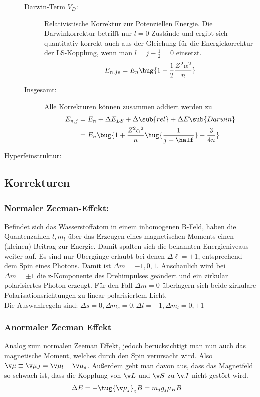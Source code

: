 \documentclass[twocolumn]{summery_4.1}
\begin{document}
\begin{description}
\begin{description}
        \item[Darwin-Term \(V_D\):] Relativistische Korrektur zur Potenziellen Energie. Die Darwinkorrektur betrifft nur \(l=0\) Zustände und ergibt sich quantitativ korrekt auch aus der Gleichung für die Energiekorrektur der LS-Kopplung, wenn man \(l=j-\frac12 =0\) einsetzt.
        \begin{align*}
            E_{n,js} = E_n\hug{1 - \frac{1}{2}\frac{Z^2\alpha^2}{n}}
        \end{align*}

        \item[Insgesamt:] Alle Korrekturen können zusammen addiert werden zu 
        \begin{align*}
            E_{n,j} &= E_n + \Delta E_{LS} + \Delta\sub{rel} + \Delta E\sub{Darwin}\\ 
            &= E_n \bug{1 + \frac{Z^2 \alpha^2}{n} \hug{\frac{1}{j + \half}}- \frac{3}{4n}}
        \end{align*}
    \end{description}


    \item[Hyperfeinstruktur:]
\end{description}



\subsection{Korrekturen}

\subsubsection{Normaler Zeeman-Effekt:}
Befindet sich das Wasserstoffatom in einem inhomogenen B-Feld, haben die Quantenzahlen \(l,m_l\) über das Erzeugen eines magnetischen Moments einen (kleinen) Beitrag zur Energie. Damit spalten sich die bekannten Energieniveaus weiter auf.     
Es sind nur Übergänge erlaubt bei denen \(\Delta \ell=\pm 1\), entsprechend dem Spin eines Photons. Damit ist \(\Delta m = -1,0,1\).
Anschaulich wird bei $\Delta m = \pm1$ die z-Komponente des Drehimpulses geändert
und ein zirkular polarisiertes Photon erzeugt. Für den Fall $\Delta m = 0$ überlagern sich beide zirkulare
Polarisationsrichtungen zu linear polarisiertem Licht.\\
Die Auswahlregeln sind: \(\Delta s = 0, \Delta m_s=0, \Delta l =\pm 1, \Delta m_l = 0,\pm1\)

\subsubsection{Anormaler Zeeman Effekt}
Analog zum normalen Zeeman Effekt, jedoch berücksichtigt man nun auch das magnetische Moment, welches durch den Spin verursacht wird. 
Also \(\v \mu \equiv \v \mu_J = \v \mu_l + \v \mu_s\). Außerdem geht man davon aus, dass das Magnetfeld so schwach ist, dass die Kopplung von \(\v L\) und \(\v S\) zu \(\v J\) nicht gestört wird. 
\begin{align*}
    \Delta E &= - \tug{\v \mu_j}_z B = m_j g_j \mu_B B
\end{align*}
\end{document}
